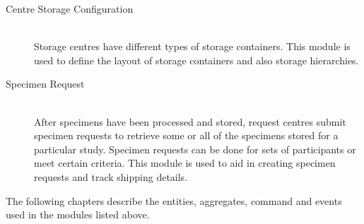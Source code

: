 \begin{description}
  \item[Centre Storage Configuration] \hfill \\ Storage centres have different
    types of storage containers. This module is used to define the layout of
    storage containers and also storage hierarchies.

  \item[Specimen Request] \hfill \\ After specimens have been processed and
    stored, request centres submit specimen requests to retrieve some or all of
    the specimens stored for a particular study. Specimen requests can be done
    for sets of participants or meet certain criteria. This module is used to
    aid in creating specimen requests and track shipping details.

\end{description}

The following chapters describe the entities, aggregates, command and events
used in the  modules listed above.

